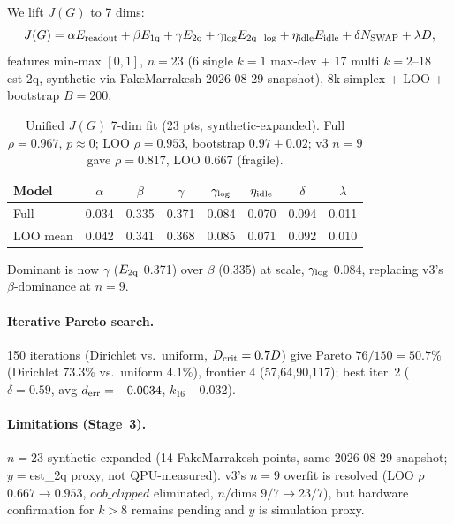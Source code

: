 ﻿\documentclass[12pt,a4paper]{article}
\begin{document}
We lift $J(G)$ to 7 dims:
\begin{equation}
J(G)=\alpha E_{\rm readout}+\beta E_{\rm 1q}+\gamma E_{\rm 2q}+\gamma_{\rm log}E_{\rm 2q\_log}+\eta_{\rm idle}E_{\rm idle}+\delta N_{\rm SWAP}+\lambda D,
\label{eq:j7}
\end{equation}
features min-max $[0,1]$, $n=23$ (6 single $k{=}1$ max-dev + 17 multi $k{=}2$--$18$ est-2q, synthetic via FakeMarrakesh 2026-08-29 snapshot),
8k simplex + LOO + bootstrap $B=200$.

\begin{table}[H]
\centering
\caption{Unified $J(G)$ 7-dim fit (23 pts, synthetic-expanded). Full $\rho=0.967$, $p\approx0$; LOO $\rho=0.953$, bootstrap $0.97\pm0.02$; v3 $n{=}9$ gave $\rho=0.817$, LOO $0.667$ (fragile).}
\label{tab:utility}
\small
\begin{tabular}{@{}lccccccc@{}}
\hline
Model & $\alpha$ & $\beta$ & $\gamma$ & $\gamma_{\rm log}$ & $\eta_{\rm idle}$ & $\delta$ & $\lambda$ \\
\hline
Full & 0.034 & 0.335 & 0.371 & 0.084 & 0.070 & 0.094 & 0.011 \\
LOO mean & 0.042 & 0.341 & 0.368 & 0.085 & 0.071 & 0.092 & 0.010 \\
\hline
\end{tabular}
\end{table}

Dominant is now $\gamma$ ($E_{\rm 2q}$ 0.371) over $\beta$ (0.335) at scale, $\gamma_{\rm log}$ 0.084, replacing v3's $\beta$-dominance at $n{=}9$.

\paragraph{Iterative Pareto search.} 150 iterations (Dirichlet vs.\ uniform,
$D_{\rm crit}=0.7D$) give Pareto $76/150=50.7\%$ (Dirichlet $73.3\%$
vs.\ uniform $4.1\%$), frontier 4 (57,64,90,117); best iter~2
($\delta=0.59$, avg $d_{\rm err}=-0.0034$, $k_{16}$ $-0.032$).

\paragraph{Limitations (Stage~3).} $n{=}23$ synthetic-expanded (14 FakeMarrakesh points, same 2026-08-29 snapshot; $y{=}$est\_2q proxy, not QPU-measured). v3's $n{=}9$ overfit is resolved (LOO $\rho$ $0.667{\to}0.953$, $oob\_clipped$ eliminated, $n$/dims $9/7{\to}23/7$), but hardware confirmation for $k{>}8$ remains pending and $y$ is simulation proxy.
\end{document}
